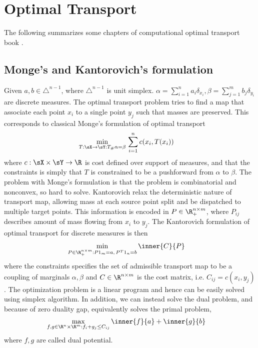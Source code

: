 \documentclass[11pt]{article}
\begin{document}
\section{Optimal Transport}

The following summarizes some chapters of computational optimal transport book \cite{peyreComputationalOptimalTransport2020}.

\subsection{Monge's and Kantorovich's formulation}

Given $a,b \in \triangle^{n-1}$, where $\triangle^{n-1}$ is unit simplex. $\alpha = \sum_{i=1}^n a_i \delta_{x_i}, \beta = \sum_{j=1}^m b_j \delta_{y_i}$ are discrete measures. The optimal transport problem tries to find a map that associate each point $x_i$ to a single point $y_j$ such that masses are preserved. This corresponds to classical Monge's formulation of optimal transport
\begin{align}
    \min_{T:\sX\to\sY: T_{\#}\alpha = \beta}\,
        &\sum_{i=1}^n c(x_i, T(x_i))
\end{align}
where $c:\sX\times\sY \to\R$ is cost defined over support of measures, and that the constraints is simply that $T$ is constrained to be a pushforward from $\alpha$ to $\beta$. The problem with Monge's formulation is that the problem is combinatorial and nonconvex, so hard to solve. Kantorovich relax the deterministic nature of transport map, allowing mass at each source point split and be dispatched to multiple target points. This information is encoded in $P\in\R^{n\times m}_+$, where $P_{ij}$ describes amount of mass flowing from $x_i$ to $y_j$. The Kantorovich formulation of optimal transport for discrete measures is then
\begin{align}
    \min_{P\in\R^{n\times m}_+: P1_m = a,\, P^T1_n = b}\,
        &\inner{C}{P}
\end{align}
where the constraints specifies the set of admissible transport map to be a coupling of marginals $\alpha,\beta$ and $C\in\R^{n\times m}$ is the cost matrix, i.e. $C_{ij} = c(x_i,y_j)$. The optimization problem is a linear program and hence can be easily solved using simplex algorithm. In addition, we can instead solve the dual problem, and because of zero duality gap, equivalently solves the primal problem,
\begin{align}
    \max_{f,g\in\R^n\times\R^m: f_i+g_j \leq C_{ij}}\,
        &\inner{f}{a} + \inner{g}{b} 
\end{align}
where $f,g$ are called dual potential.
\end{document}
